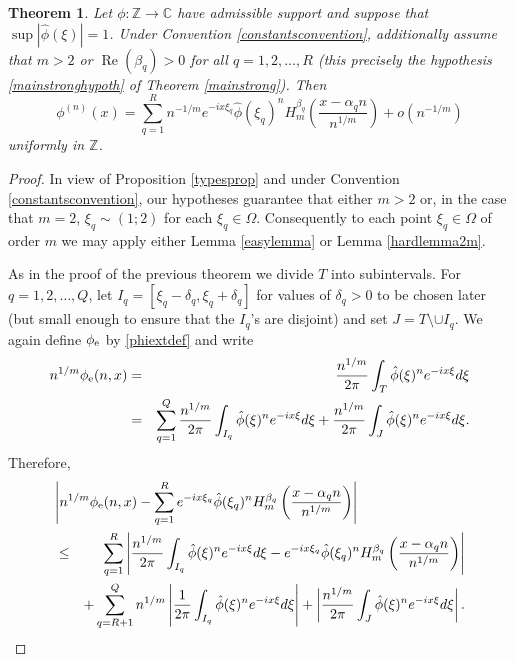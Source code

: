 \documentclass{article}
\theoremstyle{theorem}
\newtheorem{theorem}{Theorem}[section]
\theoremstyle{remark}
\renewcommand\Re{\operatorname{Re}}%
\begin{document}
\begin{theorem}\label{stongestresult}
Let $\phi:\mathbb{Z}\rightarrow\mathbb{C}$ have admissible support and suppose that $\sup|\hat{\phi}(\xi)|=1$. Under Convention \ref{constantsconvention}, additionally assume that $m>2$ or $\Re(\beta_q)>0$ for all $q=1,2,\dots, R$ (this precisely the hypothesis \eqref{mainstronghypoth} of Theorem \ref{mainstrong}). Then
\begin{equation}
\phi^{(n)}(x)=\sum_{q=1}^{R}n^{-1/m}e^{-ix\xi_q}\hat{\phi}(\xi_q)^n H_m^{\beta_q}\left(\frac{x-\alpha_qn}{n^{1/m}}\right)+o(n^{-1/m})
\end{equation}  
uniformly in $\mathbb{Z}$.
\end{theorem}

\begin{proof}
In view of Proposition \ref{typesprop} and under Convention \ref{constantsconvention}, our hypotheses guarantee that either $m>2$ or, in the case that $m=2$, $\xi_q\sim(1;2)$ for each $\xi_q\in\Omega$. Consequently to each point $\xi_q\in\Omega$ of order $m$ we may apply either Lemma \ref{easylemma} or Lemma \ref{hardlemma2m}.

As in the proof of the previous theorem we divide $T$ into subintervals. For
$q=1,2,\dots,Q$, let $I_q=[\xi_q-\delta_q,\xi_q+\delta_q]$ for values of $\delta_q>0$ to be chosen later (but small enough to ensure that the $I_q$'s are disjoint) and set $J=T\setminus\cup I_q$. We again define $\phi_{\mbox{\scriptsize{e}}}$ by \eqref{phiextdef} and write
\begin{eqnarray*}
n^{1/m}\phi_{\mbox{\scriptsize{e}}}(n,x)&=&\frac{n^{1/m}}{2\pi}\int_T
\hat{\phi}(\xi)^ne^{-ix\xi}d\xi \\
&=&\sum_{q=1}^{Q}\frac{n^{1/m}}{2\pi}\int_{I_q}
\hat{\phi}(\xi)^ne^{-ix\xi}d\xi+\frac{n^{1/m}}{2\pi}\int_J \hat{\phi}(\xi)^ne^{-ix\xi}d\xi.\\
\end{eqnarray*}
Therefore,
\begin{eqnarray}\label{splitm}\nonumber
 \lefteqn{\left|n^{1/m}\phi_{\mbox{\scriptsize{e}}}(n,x)-\sum_{q=1}^{R}e^{-ix\xi_q}\hat{\phi}(\xi_q)^n H_m^{\beta_q}\left(\frac{x-\alpha_qn}{n^{1/m}}\right)\right|}\\\nonumber
&\leq& \sum_{q=1}^{R}\left|\frac{n^{1/m}}{2\pi}\int_{I_q}
\hat{\phi}(\xi)^ne^{-ix\xi}d\xi-e^{-ix\xi_q}\hat{\phi}(\xi_q)^n H_m^{\beta_q}\left(\frac{x-\alpha_qn}{n^{1/m}}\right)\right| \\
&&+\sum_{q=R+1}^{Q} n^{1/m}\left|\frac{1}{2\pi}\int_{I_q}
\hat{\phi}(\xi)^ne^{-ix\xi}d\xi\right|+\left|\frac{n^{1/m}}{2\pi}\int_J \hat{\phi}(\xi)^ne^{-ix\xi}d\xi\right|.
\end{eqnarray}


\end{proof}
\end{document}
